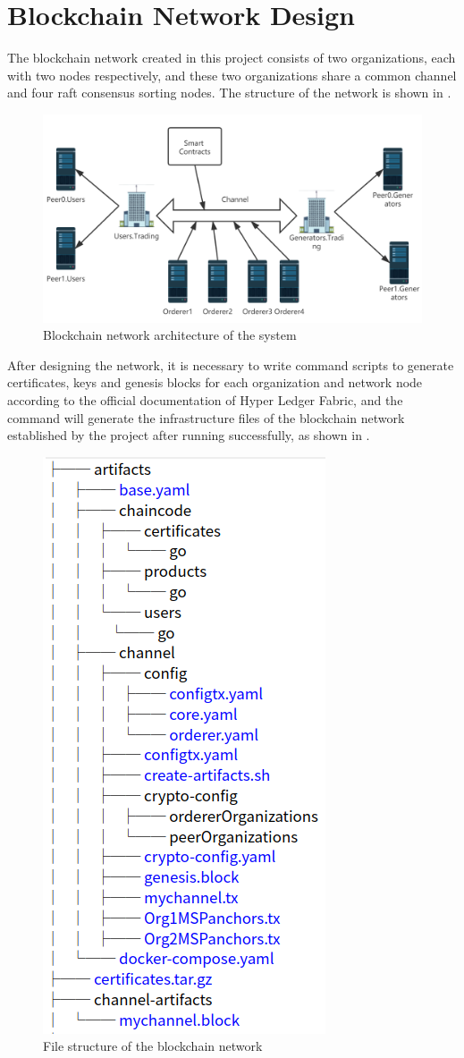 \section{Blockchain Network Design}
The blockchain network created in this project consists of two organizations, each with two nodes respectively, and these two organizations share a common channel and four raft consensus sorting nodes. The structure of the network is shown in .

\begin{figure}[!htb]
    \centering
    \includegraphics[width=.7 \textwidth]{img/networkarc.png}
    \caption{Blockchain network architecture of the system}
    \label{fig:networkarc}
\end{figure}

After designing the network, it is necessary to write command scripts to generate certificates, keys and genesis blocks for each organization and network node according to the official documentation of Hyper Ledger Fabric, and the command will generate the infrastructure files of the blockchain network established by the project after running successfully, as shown in .
\begin{figure}[!htb]
    \centering
    \includegraphics[width = .3 \textwidth]{img/artifacts.png}
    \caption{File structure of the blockchain network}
    \label{fig:networkfilestructure}
\end{figure}


